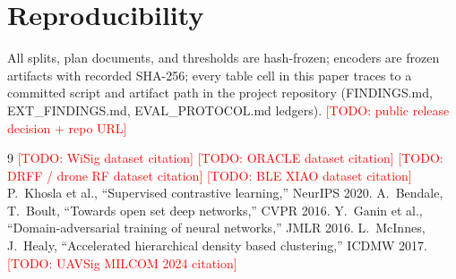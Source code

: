 \documentclass[conference]{IEEEtran}
\newcommand{\todo}[1]{\textcolor{red}{[TODO: #1]}}
\begin{document}
\section*{Reproducibility}
All splits, plan documents, and thresholds are hash-frozen; encoders are frozen artifacts with
recorded SHA-256; every table cell in this paper traces to a committed script and artifact path
in the project repository (FINDINGS.md, EXT\_FINDINGS.md, EVAL\_PROTOCOL.md ledgers).
\todo{public release decision + repo URL}

\begin{thebibliography}{9}
 \todo{WiSig dataset citation}
 \todo{ORACLE dataset citation}
 \todo{DRFF / drone RF dataset citation}
 \todo{BLE XIAO dataset citation}
 P.~Khosla et al., ``Supervised contrastive learning,'' NeurIPS 2020.
 A.~Bendale, T.~Boult, ``Towards open set deep networks,'' CVPR 2016.
 Y.~Ganin et al., ``Domain-adversarial training of neural networks,'' JMLR 2016.
 L.~McInnes, J.~Healy, ``Accelerated hierarchical density based clustering,'' ICDMW 2017.
 \todo{UAVSig MILCOM 2024 citation}
\end{thebibliography}
\end{document}
